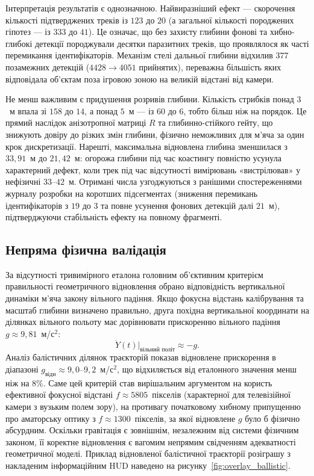 Інтерпретація результатів є однозначною. Найвиразніший ефект --- скорочення кількості
підтверджених треків із $123$ до $20$ (а загальної кількості породжених гіпотез ---
із $333$ до $41$). Це означає, що без захисту глибини фонові та хибно-глибокі детекції
породжували десятки паразитних треків, що проявлялося як часті перемикання
ідентифікаторів. Механізм стелі дальньої глибини відхилив $377$ позамежних детекцій
($4428 \to 4051$ прийнятих), переважна більшість яких відповідала об'єктам поза
ігровою зоною на великій відстані від камери.

Не менш важливим є придушення розривів глибини. Кількість стрибків понад $3$~м впала
зі $158$ до $14$, а понад $5$~м --- із $60$ до $6$, тобто більш ніж на порядок. Це
прямий наслідок анізотропної матриці $R$ та глибинно-стійкого гейту, що знижують довіру
до різких змін глибини, фізично неможливих для м'яча за один крок дискретизації.
Нарешті, максимальна відновлена глибина зменшилася з $33{,}91$~м до $21{,}42$~м: огорожа
глибини під час коастингу повністю усунула характерний дефект, коли трек під час
відсутності вимірювань «вистрілював» у нефізичні $33$--$42$~м. Отримані числа узгоджуються
з ранішими спостереженнями журналу розробки на коротших підсегментах (зниження
перемикань ідентифікаторів з $19$ до $3$ та повне усунення фонових детекцій далі $21$~м),
підтверджуючи стабільність ефекту на повному фрагменті.

\subsection{Непряма фізична валідація}

За відсутності тривимірного еталона головним об'єктивним критерієм правильності
геометричного відновлення обрано відповідність вертикальної динаміки м'яча закону
вільного падіння. Якщо фокусна відстань калібрування та масштаб глибини визначено
правильно, друга похідна вертикальної координати на ділянках вільного польоту має
дорівнювати прискоренню вільного падіння $g \approx 9{,}81$~м/с$^2$:
\begin{equation}
\ddot{Y}(t) \big|_{\text{вільний політ}} \approx -g .
\end{equation}
Аналіз балістичних ділянок траєкторій показав відновлене прискорення в діапазоні
$g_{\text{відн}} \approx 9{,}0$--$9{,}2$~м/с$^2$, що відхиляється від еталонного значення
менш ніж на $8\%$. Саме цей критерій став вирішальним аргументом на користь
ефективної фокусної відстані $f \approx 5805$~пікселів (характерної для телевізійної
камери з вузьким полем зору), на противагу початковому хибному припущенню про
аматорську оптику з $f \approx 1300$~пікселів, за якої відновлене $g$ було б
фізично абсурдним. Оскільки гравітація є зовнішнім, незалежним від системи фізичним
законом, її коректне відновлення є вагомим непрямим свідченням адекватності
геометричної моделі. Приклад відновленої балістичної траєкторії розіграшу з
накладеним інформаційним HUD наведено на рисунку~\ref{fig:overlay_ballistic}.

